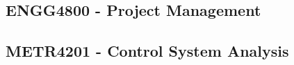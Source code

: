 \subsection{ENGG4800 - Project Management}
\clearpage

\subsection{METR4201 - Control System Analysis}
\clearpage





\begin{comment}
\begin{figure}[!htpb]
    \vspace{-3mm}
  \centering
    {
        \texttt{[image: figures/asset\_overview.png]}
    }
    \caption{Sample Asset Management User Interface Display: Asset Overview Screen}
    \label{fig:ui_mockup_overview}
    \vspace{-1mm}
\end{figure}

\begin{figure}[!htpb]
    \vspace{-3mm}
  \centering
  	{
        \texttt{[image: figures/asset\_specific.png]}
    }
    \caption{Sample Asset Management User Interface Display: Asset Lookup Screen}
    \label{fig:ui_mockup_jackHammer}
    \vspace{-1mm}
\end{figure}

Megacorp’s culture is to diversify their knowledge base and keep an open mind for new projects.  The project will align with Megacorp’s by giving employees the opportunity to grow in their technical knowledge, leadership and teamwork. The proposed asset management system will be largely targeted to construction and mining companies. This leverages a customer base, most of whom, may already be Megacorp customers. The project stakeholders include Megacorp and construction company clientele.\\

With more than 70,000 construction companies listed in Australia, the potential market size is 3500 clients if 5\% penetration is assumed~\cite{RefI2}. Table~\ref{tab_competitors} below gives an overview of the features of the proposed product compared to the closest competitors. Several services and features of the proposed product will address deficiencies of the existing competitors and set Megacorp ahead of the competition.

\begin{table}[!htpb]
    \vspace{-1mm}
  \centering
  	{
        \texttt{[image: figures/competitors.png]}
    }
    \caption{Asset Management Product Competitor Comparison~\cite{RefI3, RefI4, RefI5, RefI6, RefI7} (Key: green = product capability, yellow = product deficiency)}
    \label{tab_competitors}
    \vspace{-1mm}
\end{table}
\end{comment}
